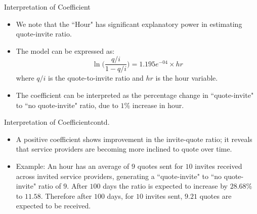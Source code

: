\documentclass{beamer}
\begin{document}
\begin{frame}{Interpretation of Coefficient}{}
\vspace{-0in}
	\begin{itemize}
		\item {We note that the ``Hour" has significant explanatory power in estimating quote-invite ratio.}\newline\vspace{-0in}		
		\item{The model can be expressed as:}\newline
	\begin{equation}
		\ln\Big(\frac{q/i}{1-q/i}\Big) = 1.195e^{-04} \times hr
	\end{equation} where $q/i$ is the quote-to-invite ratio and $hr$ is the hour variable.\newline
		\item{The coefficient can be interpreted as the percentage change in ``quote-invite" to ``no quote-invite" ratio, due to $1\%$ increase in hour.}\newline
		\end{itemize}
\end{frame}		
%		
\begin{frame}{Interpretation of Coefficient}{contd.}
\vspace{-0.15in}
	\begin{itemize}
		\item{A positive coefficient shows improvement in the invite-quote ratio; it reveals that service providers are becoming more inclined to quote over time.}\newline
	
		\item{Example:\newline
		An hour has an average of $9$ quotes sent for $10$ invites received across invited service providers, generating a ``quote-invite" to ``no quote-invite" ratio of $9$. After $100$ days the ratio is expected to increase by $28.68\%$ to $11.58$. Therefore after $100$ days, for $10$ invites sent, $9.21$ quotes are expected to be received.}\newline
		
	\end{itemize}
\end{frame}		
		
\end{document}
